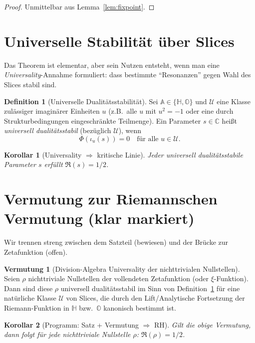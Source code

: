 \documentclass[11pt,a4paper]{article}
\theoremstyle{plain}
\newtheorem{korollar}{Korollar}
\theoremstyle{definition}
\newtheorem{definition}{Definition}
\newtheorem{conjecture}{Vermutung}
\theoremstyle{remark}
\newcommand{\C}{\mathbb{C}}
\newcommand{\Hh}{\mathbb{H}}
\newcommand{\Okt}{\mathbb{O}}
\begin{document}
\begin{proof}
Unmittelbar aus Lemma~\ref{lem:fixpoint}.
\end{proof}

\section{Universelle Stabilit\"at \"uber Slices}
Das Theorem ist elementar, aber sein Nutzen entsteht, wenn man eine \emph{Universality}-Annahme
formuliert: dass bestimmte ``Resonanzen'' gegen Wahl des Slices stabil sind.

\begin{definition}[Universelle Dualit\"atsstabilit\"at]\label{def:universal}
Sei $\mathbb{A}\in\{\Hh,\Okt\}$ und $\mathcal{U}$ eine Klasse zul\"assiger imagin\"arer Einheiten
$u$ (z.B.\ alle $u$ mit $u^2=-1$ oder eine durch Strukturbedingungen eingeschr\"ankte Teilmenge).
Ein Parameter $s\in\C$ hei\ss t \emph{universell dualit\"atsstabil} (bez\"uglich $\mathcal{U}$), wenn
\[
\Phi(\iota_u(s))=0\quad\text{f\"ur alle }u\in\mathcal{U}.
\]
\end{definition}

\begin{korollar}[Universality $\Rightarrow$ kritische Linie]
Jeder universell dualit\"atsstabile Parameter $s$ erf\"ullt $\Re(s)=1/2$.
\end{korollar}

\section{Vermutung zur Riemannschen Vermutung (klar markiert)}
Wir trennen streng zwischen dem Satzteil (bewiesen) und der Br\"ucke zur Zetafunktion (offen).

\begin{conjecture}[Division-Algebra Universality der nichttrivialen Nullstellen]
Seien $\rho$ nichttriviale Nullstellen der vollendeten Zetafunktion (oder $\xi$-Funktion).
Dann sind diese $\rho$ universell dualit\"atsstabil im Sinn von
Definition~\ref{def:universal} f\"ur eine nat\"urliche Klasse $\mathcal{U}$ von Slices, die durch den
Lift/Analytische Fortsetzung der Riemann-Funktion in $\Hh$ bzw.\ $\Okt$ kanonisch bestimmt ist.
\end{conjecture}

\begin{korollar}[Programm: Satz + Vermutung $\Rightarrow$ RH]
Gilt die obige Vermutung, dann folgt f\"ur jede nichttriviale Nullstelle $\rho$:
$\Re(\rho)=1/2$.
\end{korollar}
\end{document}
